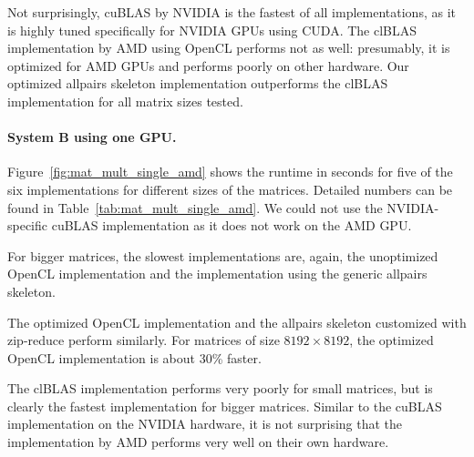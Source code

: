 Not surprisingly, cuBLAS by NVIDIA is the fastest of all implementations, as it is highly tuned specifically for NVIDIA GPUs using CUDA.
The clBLAS implementation by AMD using OpenCL performs not as well:
presumably, it is optimized for AMD GPUs and performs poorly on other hardware.
Our optimized allpairs skeleton implementation outperforms the clBLAS implementation for all matrix sizes tested.

\paragraph{System B using one GPU.}
Figure~\ref{fig:mat_mult_single_amd} shows the runtime in seconds for five of the six implementations for different sizes of the matrices.
Detailed numbers can be found in Table~\ref{tab:mat_mult_single_amd}.
We could not use the NVIDIA-specific cuBLAS implementation as it does not work on the AMD GPU.

For bigger matrices, the slowest implementations are, again, the unoptimized OpenCL implementation and the implementation using the generic allpairs skeleton.

The optimized OpenCL implementation and the allpairs skeleton customized with zip-reduce perform similarly.
For matrices of size $8192\times 8192$, the optimized OpenCL implementation is about 30\% faster.

The clBLAS implementation performs very poorly for small matrices, but is clearly the fastest implementation for bigger matrices.
Similar to the cuBLAS implementation on the NVIDIA hardware, it is not surprising that the implementation by AMD performs very well on their own hardware.


